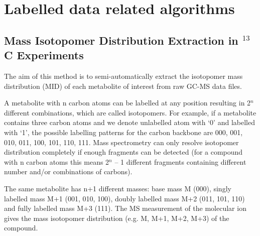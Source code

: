 

\chapter{Labelled data related algorithms}


\section
{Mass Isotopomer Distribution Extraction in $^{13}$C Experiments}


The aim of this method is to semi-automatically extract the isotopomer mass
distribution (MID) of each metabolite of interest from raw GC-MS data files.

A metabolite with n carbon atoms can be labelled at any position resulting in
2$^{n}$ different combinations, which are called isotopomers. For example, 
if a metabolite contains three carbon atoms and we denote unlabelled atom with
 ‘0’ and labelled with ‘1’, the possible labelling patterns for the carbon 
backbone are 000, 001, 010, 011, 100, 101, 110, 111. Mass spectrometry can only
resolve isotopomer distribution completely if enough fragments can be detected 
(for a compound with n carbon atoms this means 2$^{n}$ – 1 different fragments 
containing different number and/or combinations of carbons).

The same metabolite has n+1 different masses: base mass M (000), singly labelled
mass M+1 (001, 010, 100), doubly labelled mass M+2 (011, 101, 110) and fully 
labelled mass M+3 (111). The MS measurement of the molecular ion gives the mass 
isotopomer distribution (e.g. M, M+1, M+2, M+3) of the compound.

